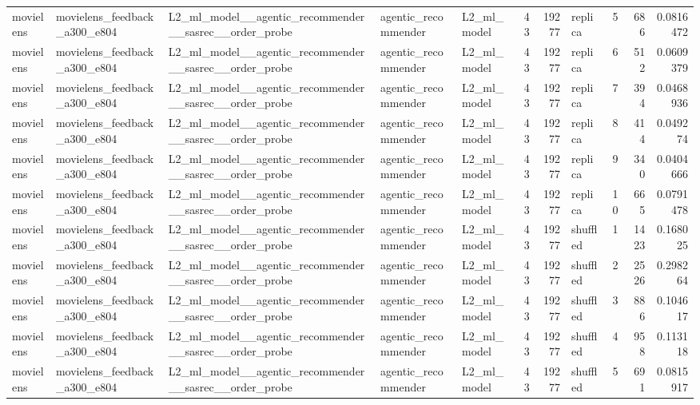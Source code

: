 \begin{table}[htbp!]
\begin{tabular}{lllllrrlrrr}
movielens & movielens\_feedback\_a300\_e804 & L2\_ml\_model\_\_agentic\_recommender\_\_sasrec\_\_order\_probe & agentic\_recommender & L2\_ml\_model & 43 & 19277 & replica & 5 & 686 & 0.0816472 \\
movielens & movielens\_feedback\_a300\_e804 & L2\_ml\_model\_\_agentic\_recommender\_\_sasrec\_\_order\_probe & agentic\_recommender & L2\_ml\_model & 43 & 19277 & replica & 6 & 512 & 0.0609379 \\
movielens & movielens\_feedback\_a300\_e804 & L2\_ml\_model\_\_agentic\_recommender\_\_sasrec\_\_order\_probe & agentic\_recommender & L2\_ml\_model & 43 & 19277 & replica & 7 & 394 & 0.0468936 \\
movielens & movielens\_feedback\_a300\_e804 & L2\_ml\_model\_\_agentic\_recommender\_\_sasrec\_\_order\_probe & agentic\_recommender & L2\_ml\_model & 43 & 19277 & replica & 8 & 414 & 0.049274 \\
movielens & movielens\_feedback\_a300\_e804 & L2\_ml\_model\_\_agentic\_recommender\_\_sasrec\_\_order\_probe & agentic\_recommender & L2\_ml\_model & 43 & 19277 & replica & 9 & 340 & 0.0404666 \\
movielens & movielens\_feedback\_a300\_e804 & L2\_ml\_model\_\_agentic\_recommender\_\_sasrec\_\_order\_probe & agentic\_recommender & L2\_ml\_model & 43 & 19277 & replica & 10 & 665 & 0.0791478 \\
movielens & movielens\_feedback\_a300\_e804 & L2\_ml\_model\_\_agentic\_recommender\_\_sasrec\_\_order\_probe & agentic\_recommender & L2\_ml\_model & 43 & 19277 & shuffled & 1 & 1423 & 0.168025 \\
movielens & movielens\_feedback\_a300\_e804 & L2\_ml\_model\_\_agentic\_recommender\_\_sasrec\_\_order\_probe & agentic\_recommender & L2\_ml\_model & 43 & 19277 & shuffled & 2 & 2526 & 0.298264 \\
movielens & movielens\_feedback\_a300\_e804 & L2\_ml\_model\_\_agentic\_recommender\_\_sasrec\_\_order\_probe & agentic\_recommender & L2\_ml\_model & 43 & 19277 & shuffled & 3 & 886 & 0.104617 \\
movielens & movielens\_feedback\_a300\_e804 & L2\_ml\_model\_\_agentic\_recommender\_\_sasrec\_\_order\_probe & agentic\_recommender & L2\_ml\_model & 43 & 19277 & shuffled & 4 & 958 & 0.113118 \\
movielens & movielens\_feedback\_a300\_e804 & L2\_ml\_model\_\_agentic\_recommender\_\_sasrec\_\_order\_probe & agentic\_recommender & L2\_ml\_model & 43 & 19277 & shuffled & 5 & 691 & 0.0815917 \\

\end{tabular}
\end{table}

